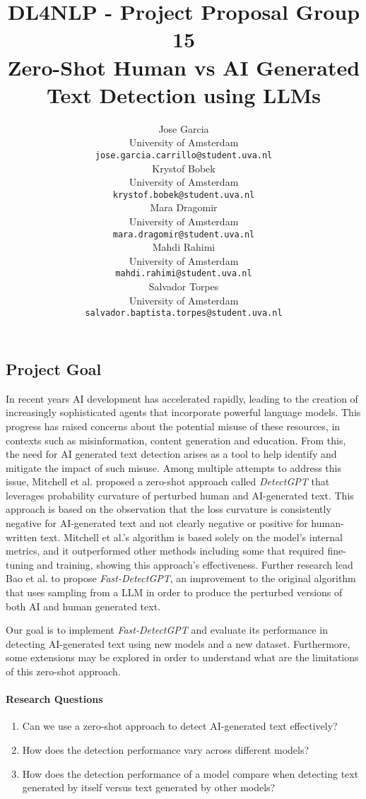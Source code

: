 \documentclass{article}
\title{DL4NLP - Project Proposal Group 15 \\ Zero-Shot Human vs AI Generated Text Detection using LLMs}
\author{%
    Jose Garcia \\
    University of Amsterdam\\
    \texttt{jose.garcia.carrillo@student.uva.nl} \\
    \And
    Krystof Bobek \\
    University of Amsterdam\\
    \texttt{krystof.bobek@student.uva.nl} \\
    \And
    Mara Dragomir \\
    University of Amsterdam\\
    \texttt{mara.dragomir@student.uva.nl} \\
    \And
    Mahdi Rahimi \\
    University of Amsterdam\\
    \texttt{mahdi.rahimi@student.uva.nl} \\
    \And
    Salvador Torpes \\
    University of Amsterdam\\
    \texttt{salvador.baptista.torpes@student.uva.nl} \\
}
\begin{document}
\maketitle



\subsection*{Project Goal}

In recent years AI development has accelerated rapidly, leading to the creation of increasingly sophisticated agents that incorporate powerful language models. This progress has raised concerns about the potential misuse of these resources, in contexts such as misinformation, content generation and education. From this, the need for AI generated text detection arises as a tool to help identify and mitigate the impact of such misuse. Among multiple attempts to address this issue, Mitchell et al.\cite{detectgpt} proposed a zero-shot approach called \textit{DetectGPT} that leverages probability curvature of perturbed human and AI-generated text. This approach is based on the observation that the loss curvature is consistently negative for AI-generated text and not clearly negative or positive for human-written text. Mitchell et al.'s \cite{detectgpt} algorithm is based solely on the model's internal metrics, and it outperformed other methods including some that required fine-tuning and training, showing this approach's effectiveness. Further research lead Bao et al.\cite{fastdetectgpt} to propose \textit{Fast-DetectGPT}, an improvement to the original algorithm that uses sampling from a LLM in order to produce the perturbed versions of both AI and human generated text.

Our goal is to implement \textit{Fast-DetectGPT} and evaluate its performance in detecting AI-generated text using new models and a new dataset. Furthermore, some extensions may be explored in order to understand what are the limitations of this zero-shot approach. 

\paragraph{Research Questions}

\begin{enumerate}
  \item Can we use a zero-shot approach to detect AI-generated text effectively?
  \item How does the detection performance vary across different models?
  \item How does the detection performance of a model compare when detecting text generated by itself versus text generated by other models?
\end{enumerate}
\end{document}
